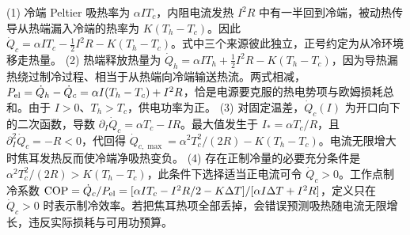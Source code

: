 (1) 冷端 Peltier 吸热率为 \(\alpha IT_c\)，内阻电流发热 \(I^2R\) 中有一半回到冷端，被动热传导从热端漏入冷端的热率为 \(K(T_h-T_c)\)。因此 \(\dot Q_c=\alpha IT_c-\tfrac12I^2R-K(T_h-T_c)\)。式中三个来源彼此独立，正号约定为从冷环境移走热量。
(2) 热端释放热量为 \(\dot Q_h=\alpha IT_h+\tfrac12I^2R-K(T_h-T_c)\)，因为导热漏热绕过制冷过程、相当于从热端向冷端输送热流。两式相减，\(P_{\rm el}=\dot Q_h-\dot Q_c=\alpha I(T_h-T_c)+I^2R\)，恰是电源要克服的热电势项与欧姆损耗总和。由于 \(I>0\)、\(T_h>T_c\)，供电功率为正。
(3) 对固定温差，\(\dot Q_c(I)\) 为开口向下的二次函数，导数 \(\partial_I\dot Q_c=\alpha T_c-IR\)。最大值发生于 \(I_*=\alpha T_c/R\)，且 \(\partial_I^2\dot Q_c=-R<0\)，代回得 \(\dot Q_{c,\max}=\alpha^2T_c^2/(2R)-K(T_h-T_c)\)。电流无限增大时焦耳发热反而使冷端净吸热变负。
(4) 存在正制冷量的必要充分条件是 \(\alpha^2T_c^2/(2R)>K(T_h-T_c)\)，此条件下选择适当正电流可令 \(\dot Q_c>0\)。工作点制冷系数 \(\mathrm{COP}=\dot Q_c/P_{\rm el}=[\alpha IT_c-I^2R/2-K\Delta T]/[\alpha I\Delta T+I^2R]\)，定义只在 \(\dot Q_c>0\) 时表示制冷效率。若把焦耳热项全部丢掉，会错误预测吸热随电流无限增长，违反实际损耗与可用功预算。
